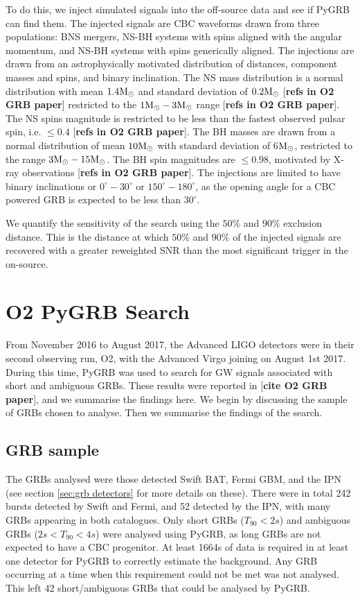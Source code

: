 \documentclass[11pt]{cuthesis}
\begin{document}
To do this, we inject simulated signals into the off-source data and see if PyGRB can find them. The injected signals are CBC waveforms drawn from three populations: BNS mergers, NS-BH systems with spins aligned with the angular momentum, and NS-BH systems with spins generically aligned. The injections are drawn from an astrophysically motivated distribution of distances, component masses and spins, and binary inclination. The NS mass distribution is a normal distribution with mean $1.4\textup{M}_\odot$ and standard deviation of $0.2\textup{M}_\odot$ [\textbf{refs in O2 GRB paper}] restricted to the $1\textup{M}_\odot-3\textup{M}_\odot$ range [\textbf{refs in O2 GRB paper}]. The NS spins magnitude is restricted to be less than the fastest observed pulsar spin, i.e. $\leq 0.4$ [\textbf{refs in O2 GRB paper}]. The BH masses are drawn from a normal distribution of mean $10\textup{M}_\odot$ with standard deviation of 6$\textup{M}_\odot$, restricted to the range $3\textup{M}_\odot-15\textup{M}_\odot$. The BH spin magnitudes are $\leq 0.98$, motivated by X-ray observations [\textbf{refs in O2 GRB paper}]. The injections are limited to have binary inclinations or $0^\circ-30^\circ$ or $150^\circ-180^\circ$, as the opening angle for a CBC powered GRB is expected to be less than $30^\circ$. 

We quantify the sensitivity of the search using the $50\%$ and $90\%$  exclusion distance. This is the distance at which $50\%$ and $90\%$ of the injected signals are recovered with a greater reweighted SNR than the most significant trigger in the on-source. 



\section{O2 PyGRB Search} 
From November 2016 to August 2017, the Advanced LIGO detectors were in their second observing run, O2, with the Advanced Virgo joining on August 1st 2017. During this time, PyGRB was used to search for GW signals associated with short and ambiguous GRBs. These results were reported in [\textbf{cite O2 GRB paper}], and we summarise the findings here. We begin by discussing the sample of GRBs chosen to analyse. Then we summarise the findings of the search. 

\subsection{GRB sample}
The GRBs analysed were those detected Swift BAT, Fermi GBM, and the IPN (see section \ref{sec:grb detectors} for more details on these). There were in total 242 bursts detected by Swift and Fermi, and 52 detected by the IPN, with many GRBs appearing in both catalogues. Only short GRBs ($T_{90}<2s$) and ambiguous GRBs ($2s<T_{90}<4s$) were analysed using PyGRB, as long GRBs are not expected to have a CBC progenitor. At least 1664s of data is required in at least one detector for PyGRB to correctly estimate the background. Any GRB occurring at a time when this requirement could not be met was not analysed. This left 42 short/ambiguous GRBs that could be analysed by PyGRB.
\end{document}
